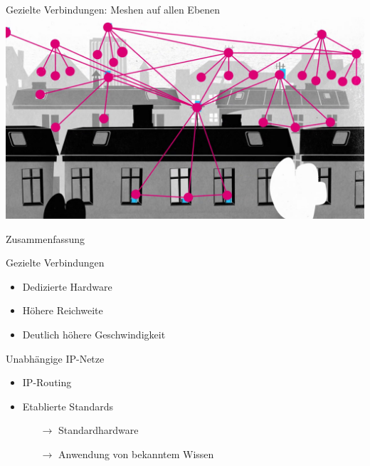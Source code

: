 \documentclass{beamer}
\begin{document}
	\begin{frame}[standout]{Gezielte Verbindungen: Meshen auf allen Ebenen}
		\includegraphics[width=\framewidth]{media/dachzudach.png}
	\end{frame}
	\begin{frame}{Zusammenfassung}
		\begin{block}{Gezielte Verbindungen}
		\begin{itemize}
			\item Dedizierte Hardware
			\item Höhere Reichweite
			\item Deutlich höhere Geschwindigkeit
		\end{itemize}
		\end{block}
		\pause
		\begin{block}{Unabhängige IP-Netze}
		\begin{itemize}
			\item IP-Routing
            \item Etablierte Standards
            \begin{itemize}
			\item[$\rightarrow$] Standardhardware
			\item[$\rightarrow$] Anwendung von bekanntem Wissen
            \end{itemize}
		\end{itemize}
		\end{block}
	\end{frame}
\end{document}
